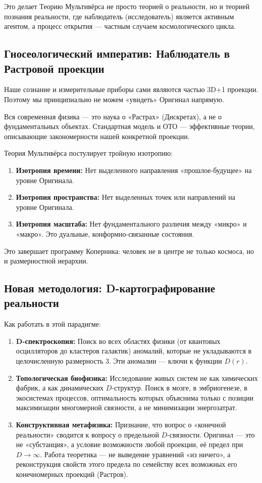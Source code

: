 \documentclass[a4paper,12pt]{article}
\begin{document}
Это делает Теорию Мультивёрса не просто теорией о реальности, но и теорией познания реальности, где наблюдатель (исследователь) является активным агентом, а процесс открытия — частным случаем космологического цикла.

\subsection{Гносеологический императив: Наблюдатель в Растровой проекции}

Наше сознание и измерительные приборы сами являются частью 3D+1 проекции. Поэтому мы принципиально не можем «увидеть» Оригинал напрямую.

Вся современная физика — это наука о «Растрах» (Дискретах), а не о фундаментальных объектах. Стандартная модель и ОТО — эффективные теории, описывающие закономерности нашей конкретной проекции.

Теория Мультивёрса постулирует тройную изотропию:
\begin{enumerate}
	\item \textbf{Изотропия времени:} Нет выделенного направления «прошлое-будущее» на уровне Оригинала.
	\item \textbf{Изотропия пространства:} Нет выделенных точек или направлений на уровне Оригинала.
	\item \textbf{Изотропия масштаба:} Нет фундаментального различия между «микро» и «макро». Это дуальные, конформно-связанные состояния.
\end{enumerate}

Это завершает программу Коперника: человек не в центре не только космоса, но и размерностной иерархии.

\subsection{Новая методология: D-картографирование реальности}

Как работать в этой парадигме:

\begin{enumerate}
	\item \textbf{D-спектроскопия:} Поиск во всех областях физики (от квантовых осцилляторов до кластеров галактик) аномалий, которые не укладываются в целочисленную размерность 3. Эти аномалии — ключи к функции $D(r)$.
	\item \textbf{Топологическая биофизика:} Исследование живых систем не как химических фабрик, а как динамических $D$-структур. Поиск в мозге, в эмбриогенезе, в экосистемах процессов, оптимальность которых объяснима только с позиции максимизации многомерной связности, а не минимизации энергозатрат.
	\item \textbf{Конструктивная метафизика:} Признание, что вопрос о «конечной реальности» сводится к вопросу о предельной $D$-связности. Оригинал — это не «субстанция», а условие возможности любой проекции, её предел при $D \to \infty$. Работа теоретика — не выведение уравнений «из ничего», а реконструкция свойств этого предела по семейству всех возможных его конечномерных проекций (Растров).
\end{enumerate}
\end{document}
